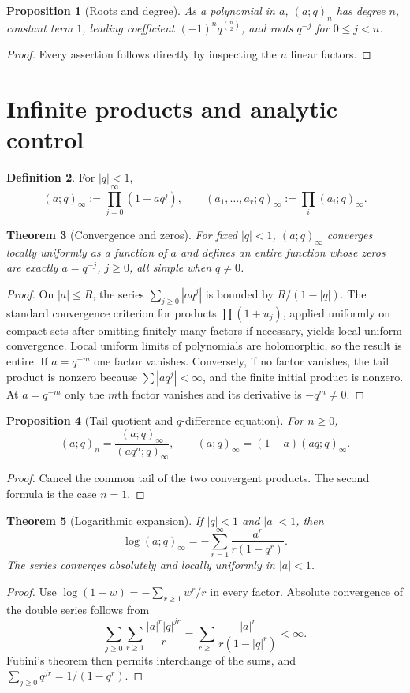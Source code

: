 \documentclass[11pt]{article}
\numberwithin{equation}{section}
\newtheorem{theorem}{Theorem}[section]
\newtheorem{proposition}[theorem]{Proposition}
\theoremstyle{definition}
\newtheorem{definition}[theorem]{Definition}
\begin{document}
\begin{proposition}[Roots and degree]
As a polynomial in $a$, $(a;q)_n$ has degree $n$, constant term $1$, leading coefficient $(-1)^nq^{\binom n2}$, and roots $q^{-j}$ for $0\le j<n$.
\end{proposition}
\begin{proof}
Every assertion follows directly by inspecting the $n$ linear factors.
\end{proof}

\section{Infinite products and analytic control}
\begin{definition}
For $|q|<1$,
\[
(a;q)_\infty:=\prod_{j=0}^{\infty}(1-aq^j),\qquad
(a_1,\ldots,a_r;q)_\infty:=\prod_i(a_i;q)_\infty.
\]
\end{definition}

\begin{theorem}[Convergence and zeros]
For fixed $|q|<1$, $(a;q)_\infty$ converges locally uniformly as a function of $a$ and defines an entire function whose zeros are exactly $a=q^{-j}$, $j\ge0$, all simple when $q\ne0$.
\end{theorem}
\begin{proof}
On $|a|\le R$, the series $\sum_{j\ge0}|aq^j|$ is bounded by $R/(1-|q|)$.  The standard convergence criterion for products $\prod(1+u_j)$, applied uniformly on compact sets after omitting finitely many factors if necessary, yields local uniform convergence.  Local uniform limits of polynomials are holomorphic, so the result is entire.  If $a=q^{-m}$ one factor vanishes.  Conversely, if no factor vanishes, the tail product is nonzero because $\sum|aq^j|<\infty$, and the finite initial product is nonzero.  At $a=q^{-m}$ only the $m$th factor vanishes and its derivative is $-q^m\ne0$.
\end{proof}

\begin{proposition}[Tail quotient and $q$-difference equation]
For $n\ge0$,
\[
(a;q)_n=\frac{(a;q)_\infty}{(aq^n;q)_\infty},\qquad
(a;q)_\infty=(1-a)(aq;q)_\infty.
\]
\end{proposition}
\begin{proof}
Cancel the common tail of the two convergent products.  The second formula is the case $n=1$.
\end{proof}

\begin{theorem}[Logarithmic expansion]
If $|q|<1$ and $|a|<1$, then
\[
\log(a;q)_\infty=-\sum_{r=1}^{\infty}\frac{a^r}{r(1-q^r)}.
\]
The series converges absolutely and locally uniformly in $|a|<1$.
\end{theorem}
\begin{proof}
Use $\log(1-w)=-\sum_{r\ge1}w^r/r$ in every factor.  Absolute convergence of the double series follows from
\[
\sum_{j\ge0}\sum_{r\ge1}\frac{|a|^r|q|^{jr}}r
=\sum_{r\ge1}\frac{|a|^r}{r(1-|q|^r)}<\infty.
\]
Fubini's theorem then permits interchange of the sums, and $\sum_{j\ge0}q^{jr}=1/(1-q^r)$.
\end{proof}
\end{document}
